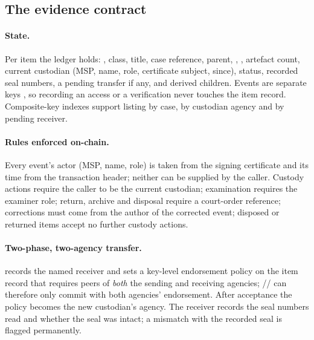 \subsection{The evidence contract}
\paragraph{State.} Per item the ledger holds: , class, title, case reference, parent, , , artefact count, current custodian (MSP, name, role, certificate subject, since), status, recorded seal numbers, a pending transfer if any, and derived children. Events are separate keys , so recording an access or a verification never touches the item record. Composite-key indexes support listing by case, by custodian agency and by pending receiver.

\paragraph{Rules enforced on-chain.} Every event's actor (MSP, name, role) is taken from the signing certificate and its time from the transaction header; neither can be supplied by the caller. Custody actions require the caller to be the current custodian; examination requires the examiner role; return, archive and disposal require a court-order reference; corrections must come from the author of the corrected event; disposed or returned items accept no further custody actions.

\paragraph{Two-phase, two-agency transfer.}  records the named receiver and sets a key-level endorsement policy on the item record that requires peers of \emph{both} the sending and receiving agencies; // can therefore only commit with both agencies' endorsement. After acceptance the policy becomes the new custodian's agency. The receiver records the seal numbers read and whether the seal was intact; a mismatch with the recorded seal is flagged permanently.

